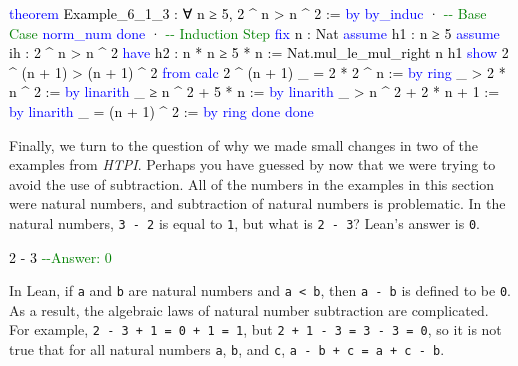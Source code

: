 \documentclass[
  letterpaper,
  DIV=11,
  numbers=noendperiod]{scrreprt}
\makeatletter
\newenvironment{Shaded}{\begin{snugshade}}{\end{snugshade}}
\newcommand{\CommentTok}[1]{\textcolor[rgb]{0.37,0.37,0.37}{#1}}
\newcommand{\DocumentationTok}[1]{\textcolor[rgb]{0.37,0.37,0.37}{\textit{#1}}}
\newcommand{\KeywordTok}[1]{\textcolor[rgb]{0.00,0.23,0.31}{#1}}
\newcommand{\NormalTok}[1]{\textcolor[rgb]{0.00,0.23,0.31}{#1}}
\newcommand{\SpecialCharTok}[1]{\textcolor[rgb]{0.37,0.37,0.37}{#1}}
\def\bluesquiggly{\bgroup \markoverwith{\textcolor[HTML]{1E90FF}{\lower3.5\p@\hbox{\sixly \char58}}}\ULon}
\renewcommand{\NormalTok}[1]{\textcolor[HTML]{000000}{#1}}
\renewcommand{\KeywordTok}[1]{\textcolor[HTML]{0000FF}{#1}}
\renewcommand{\SpecialCharTok}[1]{}
\renewcommand{\CommentTok}[1]{\textcolor[HTML]{008000}{#1}}
\renewcommand{\DocumentationTok}[1]{\bluesquiggly{\textcolor[HTML]{0000FF}{#1}}}
\theoremstyle{remark}
\makeatother
\begin{document}
\begin{Shaded}
\begin{Highlighting}[]
\KeywordTok{theorem}\NormalTok{ Example\_6\_1\_3 : ∀ n ≥ 5, 2 \^{} n \textgreater{} n \^{} 2 := }\KeywordTok{by}
  \KeywordTok{by\_induc}
\NormalTok{  · }\CommentTok{{-}{-} Base Case}
    \KeywordTok{norm\_num}
    \KeywordTok{done}
\NormalTok{  · }\CommentTok{{-}{-} Induction Step}
    \KeywordTok{fix}\NormalTok{ n : Nat}
    \KeywordTok{assume}\NormalTok{ h1 : n ≥ 5}
    \KeywordTok{assume}\NormalTok{ ih : 2 \^{} n \textgreater{} n \^{} 2}
    \KeywordTok{have}\NormalTok{ h2 : n * n ≥ 5 * n := Nat.mul\_le\_mul\_right n h1}
    \KeywordTok{show}\NormalTok{ 2 \^{} (n + 1) \textgreater{} (n + 1) \^{} 2 }\KeywordTok{from}
      \KeywordTok{calc}\NormalTok{ 2 \^{} (n + 1)}
\NormalTok{        \_ = 2 * 2 \^{} n := }\KeywordTok{by} \KeywordTok{ring}
\NormalTok{        \_ \textgreater{} 2 * n \^{} 2 := }\KeywordTok{by} \KeywordTok{linarith}
\NormalTok{        \_ ≥ n \^{} 2 + 5 * n := }\KeywordTok{by} \KeywordTok{linarith}
\NormalTok{        \_ \textgreater{} n \^{} 2 + 2 * n + 1 := }\KeywordTok{by} \KeywordTok{linarith}
\NormalTok{        \_ = (n + 1) \^{} 2 := }\KeywordTok{by} \KeywordTok{ring}
    \KeywordTok{done}
  \KeywordTok{done}
\end{Highlighting}
\end{Shaded}

Finally, we turn to the question of why we made small changes in two of
the examples from \emph{HTPI}. Perhaps you have guessed by now that we
were trying to avoid the use of subtraction. All of the numbers in the
examples in this section were natural numbers, and subtraction of
natural numbers is problematic. In the natural numbers, \texttt{3\ -\ 2}
is equal to \texttt{1}, but what is \texttt{2\ -\ 3}? Lean's answer is
\texttt{0}.

\begin{Shaded}
\begin{Highlighting}[]
\SpecialCharTok{++}\DocumentationTok{\#eval}\SpecialCharTok{::}\NormalTok{ 2 {-} 3     }\CommentTok{{-}{-}Answer: 0}
\end{Highlighting}
\end{Shaded}

In Lean, if \texttt{a} and \texttt{b} are natural numbers and
\texttt{a\ \textless{}\ b}, then \texttt{a\ -\ b} is defined to be
\texttt{0}. As a result, the algebraic laws of natural number
subtraction are complicated. For example,
\texttt{2\ -\ 3\ +\ 1\ =\ 0\ +\ 1\ =\ 1}, but
\texttt{2\ +\ 1\ -\ 3\ =\ 3\ -\ 3\ =\ 0}, so it is not true that for all
natural numbers \texttt{a}, \texttt{b}, and \texttt{c},
\texttt{a\ -\ b\ +\ c\ =\ a\ +\ c\ -\ b}.
\end{document}
